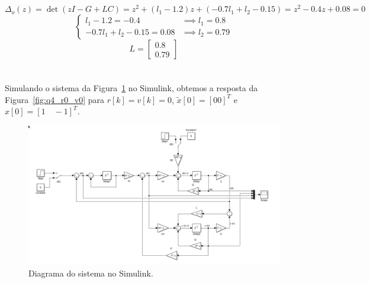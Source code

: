 \documentclass{article}
\DeclareMathOperator\det{det}
\begin{document}
    \[ \Delta_o(z) = \det(zI -G +LC) = z^2 + (l_1 -1.2)z +(-0.7l_1 + l_2 -0.15) =
        z^2 -0.4z +0.08 = 0
    \]
    \[
        \begin{cases}
            l_1 - 1.2 = -0.4 & \implies l_1 = 0.8\\
            -0.7l_1 + l_2 -0.15 = 0.08 & \implies l_2 = 0.79
        \end{cases}
    \]
    \[ L = \begin{bmatrix}
            0.8\\
            0.79
        \end{bmatrix}
    \]


\section{\normalsize {}}

    {Simulando o sistema da Figura~\ref{fig:simulink_q4} no Simulink, obtemos a
    resposta da Figura~\ref{fig:q4_r0_v0} para $r[k]=v[k]=0$,
    $\tilde{x}[0] = [0 0]^T$ e $x[0] = [1\quad -1]^T$.}

    \begin{figure}[H]
        \centering
        \includegraphics[width=1\linewidth]{images/simulink_q4.png}
        \caption{Diagrama do sistema no Simulink.}\label{fig:simulink_q4}
    \end{figure}
\end{document}
